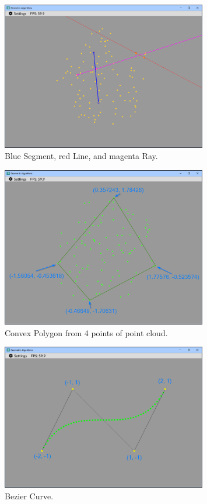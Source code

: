 \documentclass[12pt,a4paper,english]{article}
\begin{document}
\begin{figure}[H]
    \centering
    \includegraphics[width=0.8\textwidth]{segment_ray_line}
    \caption[]{Blue Segment, red Line, and magenta Ray.}
    \label{fig:segment_ray_line}
\end{figure}

\begin{figure}[H]
    \centering
    \includegraphics[width=0.8\textwidth]{convex_polygon}
    \caption[]{Convex Polygon from 4 points of point cloud.}
    \label{fig:convex_polygon}
\end{figure}

\begin{figure}[H]
    \centering
    \includegraphics[width=0.8\textwidth]{bezier_curve}
    \caption[]{Bezier Curve.}
    \label{fig:bezier_curve}
\end{figure}
\end{document}
